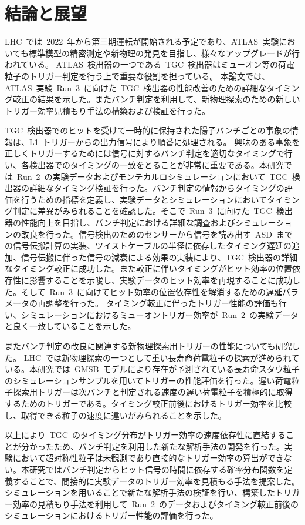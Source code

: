 \chapter{結論と展望}
\thispagestyle{empty}
\label{chap:7}
LHC~では~2022~年から第三期運転が開始される予定であり、ATLAS~実験においても標準模型の精密測定や新物理の発見を目指し、様々なアップグレードが行われている。
ATLAS~検出器の一つである~TGC~検出器はミューオン等の荷電粒子のトリガー判定を行う上で重要な役割を担っている。
本論文では、ATLAS~実験~Run~3~に向けた~TGC~検出器の性能改善のための詳細なタイミング較正の結果を示した。またバンチ判定を利用して、新物理探索のための新しいトリガー効率見積もり手法の構築および検証を行った。

TGC~検出器でのヒットを受けて一時的に保持された陽子バンチごとの事象の情報は、L1~トリガーからの出力信号により順番に処理される。
興味のある事象を正しくトリガーするためには信号に対するバンチ判定を適切なタイミングで行い、各検出器でのタイミングの一致をとることが非常に重要である。本研究では~Run~2~の実験データおよびモンテカルロシミュレーションにおいて~TGC~検出器の詳細なタイミング検証を行った。バンチ判定の情報からタイミングの評価を行うための指標を定義し、実験データとシミュレーションにおいてタイミング判定に差異がみられることを確認した。そこで~Run~3~に向けた~TGC~検出器の性能向上を目指し、バンチ判定における詳細な調査およびシミュレーションの改良を行った。信号検出のためのセンサーから信号を読み出す~ASD~までの信号伝搬計算の実装、ツイストケーブルの半径に依存したタイミング遅延の追加、信号伝搬に伴った信号の減衰による効果の実装により、TGC~検出器の詳細なタイミング較正に成功した。また較正に伴いタイミングがヒット効率の位置依存性に影響することを示唆し、実験データのヒット効率を再現することに成功した。そして~Run~3~に向けてヒット効率の位置依存性を解消するための遅延パラメータの再調整を行った。
タイミング較正に伴ったトリガー性能の評価も行い、シミュレーションにおけるミューオントリガー効率が~Run~2~の実験データと良く一致していることを示した。

またバンチ判定の改良に関連する新物理探索用トリガーの性能についても研究した。
LHC~では新物理探索の一つとして重い長寿命荷電粒子の探索が進められている。本研究では~GMSB~モデルにより存在が予測されている長寿命スタウ粒子のシミュレーションサンプルを用いてトリガーの性能評価を行った。遅い荷電粒子探索用トリガーは次バンチと判定される速度の遅い荷電粒子を積極的に取得するためのトリガーである。タイミング較正前後におけるトリガー効率を比較し、取得できる粒子の速度に違いがみられることを示した。

以上により~TGC~のタイミング分布がトリガー効率の速度依存性に直結することが分かったため、バンチ判定を利用した新たな解析手法の開発を行った。実験において超対称性粒子は未観測であり直接的なトリガー効率の算出ができない。本研究ではバンチ判定からヒット信号の時間に依存する確率分布関数を定義することで、間接的に実験データのトリガー効率を見積もる手法を提案した。シミュレーションを用いることで新たな解析手法の検証を行い、構築したトリガー効率の見積もり手法を利用して~Run~2~のデータおよびタイミング較正前後のシミュレーションにおけるトリガー性能の評価を行った。


